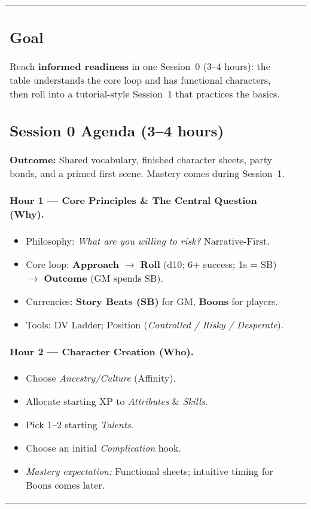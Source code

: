 \begin{tabularx}{\linewidth}{>{\bfseries}l X}
\subsection*{Goal}
Reach \textbf{informed readiness} in one Session~0 (3–4 hours): the table understands the core loop and has functional characters, then roll into a tutorial-style Session~1 that practices the basics.

\subsection*{Session 0 Agenda (3–4 hours)}
\begin{tcolorbox}[title={Overview},colback=gray!5,colframe=black]
\textbf{Outcome:} Shared vocabulary, finished character sheets, party bonds, and a primed first scene. Mastery comes during Session~1.
\end{tcolorbox}

\paragraph{Hour 1 — Core Principles \& The Central Question (Why).}
\begin{itemize}
  \item Philosophy: \emph{What are you willing to risk?} Narrative-First.
  \item Core loop: \textbf{Approach} $\rightarrow$ \textbf{Roll} (d10; 6+ success; 1s = SB) $\rightarrow$ \textbf{Outcome} (GM spends SB).
  \item Currencies: \textbf{Story Beats (SB)} for GM, \textbf{Boons} for players.
  \item Tools: DV Ladder; Position (\textit{Controlled / Risky / Desperate}).
\end{itemize}

\paragraph{Hour 2 — Character Creation (Who).}
\begin{itemize}
  \item Choose \emph{Ancestry/Culture} (Affinity).
  \item Allocate starting XP to \emph{Attributes} \& \emph{Skills}.
  \item Pick 1–2 starting \emph{Talents}.
  \item Choose an initial \emph{Complication} hook.
  \item \textit{Mastery expectation:} Functional sheets; intuitive timing for Boons comes later.
\end{itemize}


\end{tabularx}
